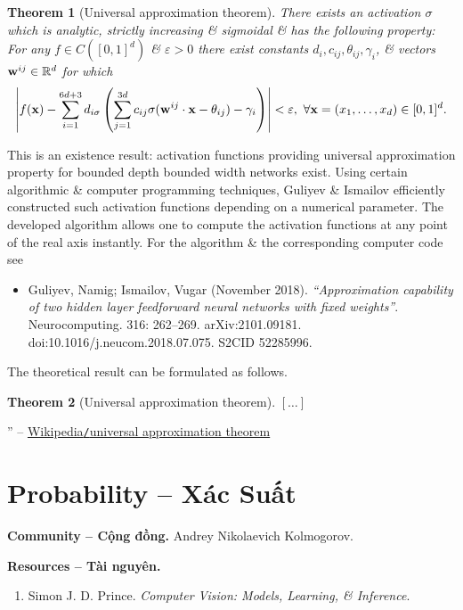 \documentclass{article}
\newtheorem{theorem}{Theorem}
\begin{document}
\begin{theorem}[Universal approximation theorem]
	There exists an activation $\sigma$ which is analytic, strictly increasing \& sigmoidal \& has the following property: For any $f\in C([0,1]^d)$ \& $\varepsilon > 0$ there exist constants $d_i,c_{ij},\theta_{ij},\gamma_i$, \& vectors ${\bf w}^{ij}\in\mathbb{R}^d$ for which
	\begin{equation*}
		\left|f({\bf x}) - \sum_{i=1}^{6d + 3} d_{i\sigma}\left(\sum_{j=1}^{3d} c_{ij}\sigma({\bf w}^{ij}\cdot{\bf x} - \theta_{ij}) - \gamma_i\right)\right| < \varepsilon,\ \forall{\bf x} = (x_1,\ldots,x_d)\in[0,1]^d.
	\end{equation*}
\end{theorem}
This is an existence result: activation functions providing universal approximation property for bounded depth bounded width networks exist. Using certain algorithmic \& computer programming techniques, Guliyev \& Ismailov efficiently constructed such activation functions depending on a numerical parameter. The developed algorithm allows one to compute the activation functions at any point of the real axis instantly. For the algorithm \& the corresponding computer code see
\begin{itemize}
	\item {\sc Guliyev, Namig; Ismailov, Vugar} (November 2018). {\it``Approximation capability of two hidden layer feedforward neural networks with fixed weights''}. Neurocomputing. 316: 262--269. arXiv:2101.09181. doi:10.1016/j.neucom.2018.07.075. S2CID 52285996.
\end{itemize}
The theoretical result can be formulated as follows.

\begin{theorem}[Universal approximation theorem]
	$[\ldots]$
\end{theorem}
'' -- \href{https://en.wikipedia.org/wiki/Universal_approximation_theorem}{Wikipedia{\tt/}universal approximation theorem}


\section{Probability -- Xác Suất}
\textbf{\textsf{Community -- Cộng đồng.}} {\sc Andrey Nikolaevich Kolmogorov}.

\noindent\textbf{\textsf{Resources -- Tài nguyên.}}
\begin{enumerate}
	\item {\sc Simon J. D. Prince}. {\it Computer Vision: Models, Learning, \& Inference}.
\end{enumerate}
\end{document}
